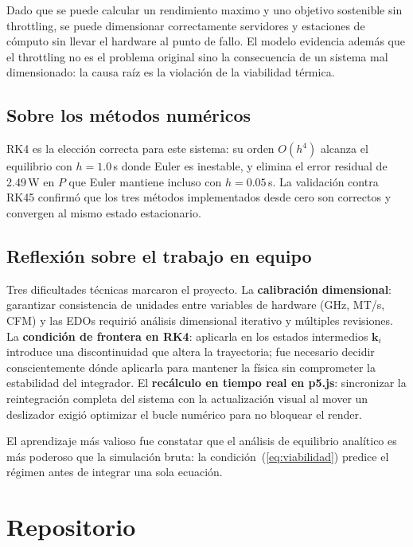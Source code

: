 \documentclass[10pt, twocolumn]{article}
\begin{document}
Dado que se puede calcular un rendimiento maximo y uno objetivo sostenible sin throttling, se puede dimensionar correctamente servidores y
estaciones de cómputo sin llevar el hardware al punto de fallo. El modelo
evidencia además que el throttling no es el problema original sino la
consecuencia de un sistema mal dimensionado: la causa raíz es la violación
de la viabilidad térmica.

\subsection{Sobre los métodos numéricos}

RK4 es la elección correcta para este sistema: su orden $O(h^4)$ alcanza
el equilibrio con $h=1.0$\,s donde Euler es inestable, y elimina el error
residual de 2.49\,W en $P$ que Euler mantiene incluso con $h=0.05$\,s.
La validación contra RK45 confirmó que los tres métodos implementados
desde cero son correctos y convergen al mismo estado estacionario.

\subsection{Reflexión sobre el trabajo en equipo}

Tres dificultades técnicas marcaron el proyecto. La \textbf{calibración
dimensional}: garantizar consistencia de unidades entre variables de
hardware (GHz, MT/s, CFM) y las EDOs requirió análisis dimensional
iterativo y múltiples revisiones. La \textbf{condición de frontera en
RK4}: aplicarla en los estados intermedios $\mathbf{k}_i$ introduce una
discontinuidad que altera la trayectoria; fue necesario decidir
conscientemente dónde aplicarla para mantener la física sin comprometer
la estabilidad del integrador. El \textbf{recálculo en tiempo real en
p5.js}: sincronizar la reintegración completa del sistema con la
actualización visual al mover un deslizador exigió optimizar el bucle
numérico para no bloquear el render.

El aprendizaje más valioso fue constatar que el análisis de equilibrio
analítico es más poderoso que la simulación bruta: la condición~(\ref{eq:viabilidad})
predice el régimen antes de integrar una sola ecuación.

\section*{Repositorio}
\end{document}
